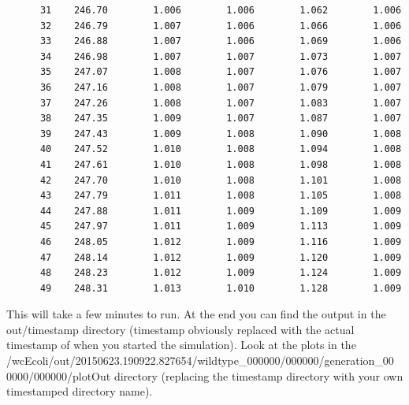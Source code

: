 \documentclass[12pt]{article}
\begin{document}
\begin{lstlisting}
      31    246.70        1.006        1.006        1.062        1.006
      32    246.79        1.007        1.006        1.066        1.006
      33    246.88        1.007        1.006        1.069        1.006
      34    246.98        1.007        1.007        1.073        1.007
      35    247.07        1.008        1.007        1.076        1.007
      36    247.16        1.008        1.007        1.079        1.007
      37    247.26        1.008        1.007        1.083        1.007
      38    247.35        1.009        1.007        1.087        1.007
      39    247.43        1.009        1.008        1.090        1.008
      40    247.52        1.010        1.008        1.094        1.008
      41    247.61        1.010        1.008        1.098        1.008
      42    247.70        1.010        1.008        1.101        1.008
      43    247.79        1.011        1.008        1.105        1.008
      44    247.88        1.011        1.009        1.109        1.009
      45    247.97        1.011        1.009        1.113        1.009
      46    248.05        1.012        1.009        1.116        1.009
      47    248.14        1.012        1.009        1.120        1.009
      48    248.23        1.012        1.009        1.124        1.009
      49    248.31        1.013        1.010        1.128        1.009
\end{lstlisting}

\hfill \break
\hfill \break

This will take a few minutes to run. At the end you can find the output in the out/timestamp directory (timestamp obviously replaced with the actual timestamp of when you started the simulation). Look at the plots in the /wcEcoli/out/20150623.190922.827654/wildtype\_000000/000000/generation\_00
0000/000000/plotOut directory (replacing the timestamp directory with your own timestamped directory name).
\end{document}
